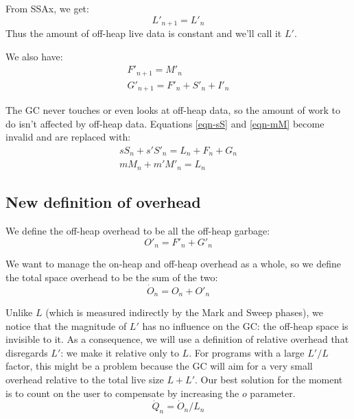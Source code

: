\documentclass{article}
\begin{document}
From SSAx, we get:
\begin{equation}
L'_{n+1} = L'_n
\end{equation}
Thus the amount of off-heap live data is constant and we'll call it
$L'$.

We also have:
\begin{gather}
F'_{n+1} = M'_n    \label{eqn-F'} \\
G'_{n+1} = F'_n + S'_n + I'_n   \label{eqn-G'}
\end{gather}

The GC never touches or even looks at off-heap data, so the amount of
work to do isn't affected by off-heap data. Equations \eqref{eqn-sS} and
\eqref{eqn-mM} become invalid and are replaced with:
\begin{gather}
 sS_n + s'S'_n = L_n + F_n + G_n   \label{eqn-sS'} \\
 mM_n + m'M'_n = L_n   \label{eqn-mM'}
\end{gather}


\subsection{New definition of overhead}

We define the off-heap overhead to be all the off-heap garbage:
\begin{equation}\label{def-O'}
O'_n = F'_n + G'_n
\end{equation}


We want to manage the on-heap and off-heap overhead as a whole, so we
define the total space overhead to be the sum of the two:
\begin{equation}\label{def-Obar}
 \dot{O}_n = O_n + O'_n
\end{equation}

Unlike $L$ (which is measured indirectly by the Mark and Sweep
phases), we notice that the magnitude of $L'$ has no influence on the
GC: the off-heap space is invisible to it. As a consequence, we will
use a definition of relative overhead that disregards $L'$: we make it
relative only to $L$.
For programs with a large $L'/L$ factor, this might be a problem because
the GC will aim for a very small overhead relative to the total live
size $L+L'$. Our best solution for the moment is to count on the user
to compensate by increasing the $o$ parameter.
\begin{equation}\label{def-Qbar}
\dot{Q}_n = \dot{O}_n / L_n
\end{equation}
\end{document}

